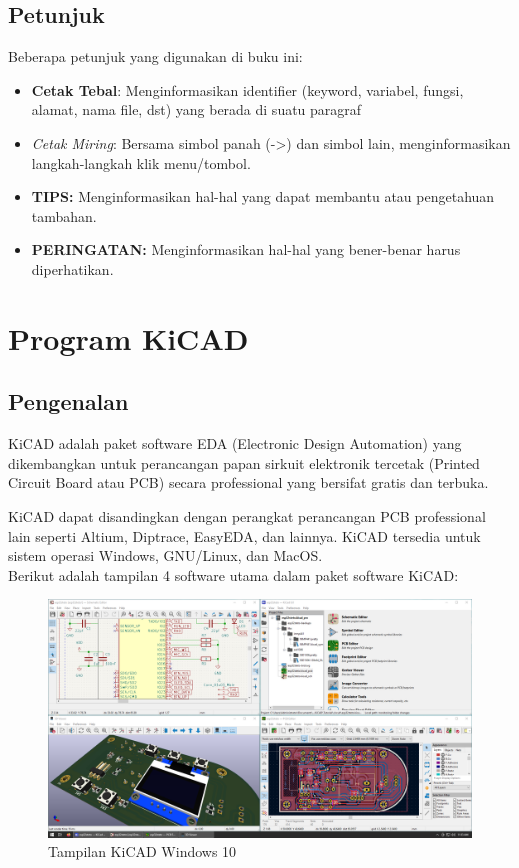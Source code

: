 \documentclass[12pt]{book}
\begin{document}
	\section{Petunjuk}
	Beberapa petunjuk yang digunakan di buku ini:
	\begin{itemize}
		\item \textbf{Cetak Tebal}: Menginformasikan identifier (keyword, variabel, fungsi, alamat, nama file, dst) yang berada di suatu paragraf
		\item \textit{Cetak Miring}: Bersama simbol panah (->) dan simbol lain, menginformasikan langkah-langkah klik menu/tombol.
		\item \textbf{TIPS:} Menginformasikan hal-hal yang dapat membantu atau pengetahuan tambahan.
		\item \textbf{PERINGATAN:} Menginformasikan hal-hal yang bener-benar harus diperhatikan.
	\end{itemize}


	\newpage
	\mainmatter
	\chapter{Program KiCAD}

	\section{Pengenalan}

	KiCAD adalah paket software EDA (Electronic Design Automation) yang dikembangkan untuk perancangan papan sirkuit elektronik tercetak (Printed Circuit Board atau PCB)
	secara professional yang bersifat gratis dan terbuka.

	KiCAD dapat disandingkan dengan perangkat perancangan PCB professional lain seperti Altium, Diptrace, EasyEDA, dan lainnya.
	KiCAD tersedia untuk sistem operasi Windows, GNU/Linux, dan MacOS.\\

	Berikut adalah tampilan 4 software utama dalam paket software KiCAD:
	\begin{figure}[!ht]
		\centering
		\includegraphics[width=\textwidth]{images/kicad_windows10}
		\caption{Tampilan KiCAD Windows 10}
	\end{figure}
\end{document}
